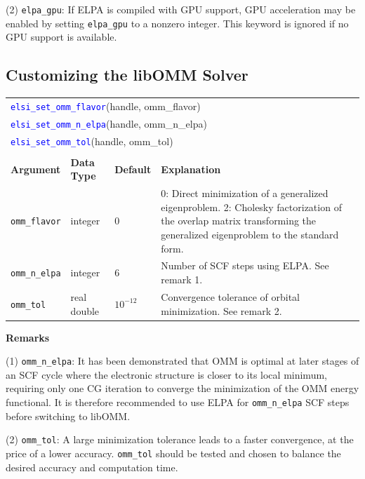 \documentclass{report}
\newcommand{\api}[1]{\textcolor{blue}{\texttt{#1}}}
\begin{document}
(2) \texttt{elpa\_gpu}: If ELPA is compiled with GPU support, GPU acceleration may be enabled by setting \texttt{elpa\_gpu} to a nonzero integer. This keyword is ignored if no GPU support is available.

\subsection{Customizing the libOMM Solver}
\label{subsec:setter_omm}
\begin{tabular}[]{|p{30mm}|p{20mm}|p{15mm}|p{97mm}|}
\multicolumn{4}{l}{\api{elsi\_set\_omm\_flavor}(handle, omm\_flavor)}\\
\multicolumn{4}{l}{\api{elsi\_set\_omm\_n\_elpa}(handle, omm\_n\_elpa)}\\
\multicolumn{4}{l}{\api{elsi\_set\_omm\_tol}(handle, omm\_tol)}\\
\multicolumn{4}{l}{}\\
\hline
\multicolumn{1}{|l|}{\textbf{Argument}} & \multicolumn{1}{l|}{\textbf{Data Type}} & \multicolumn{1}{l|}{\textbf{Default}} & \multicolumn{1}{l|}{\textbf{Explanation}}\\
\hline
\texttt{omm\_flavor}  & integer     & 0          & 0: Direct minimization of a generalized eigenproblem. 2: Cholesky factorization of the overlap matrix transforming the generalized eigenproblem to the standard form.\\
\hline
\texttt{omm\_n\_elpa} & integer     & 6          & Number of SCF steps using ELPA. See remark 1.\\
\hline
\texttt{omm\_tol}     & real double & $10^{-12}$ & Convergence tolerance of orbital minimization. See remark 2.\\
\hline
\end{tabular}

\textbf{Remarks}

(1) \texttt{omm\_n\_elpa}: It has been demonstrated that OMM is optimal at later stages of an SCF cycle where the electronic structure is closer to its local minimum, requiring only one CG iteration to converge the minimization of the OMM energy functional. It is therefore recommended to use ELPA for \texttt{omm\_n\_elpa} SCF steps before switching to libOMM.

(2) \texttt{omm\_tol}: A large minimization tolerance leads to a faster convergence, at the price of a lower accuracy. \texttt{omm\_tol} should be tested and chosen to balance the desired accuracy and computation time.
\end{document}
